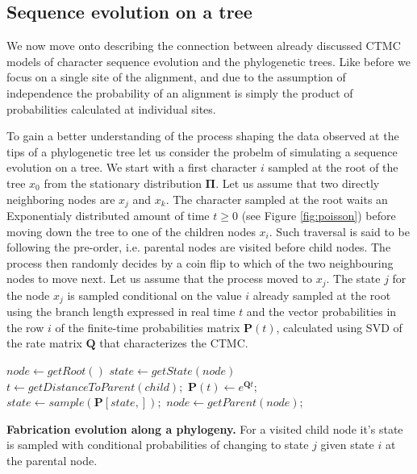 \documentclass[12pt,twoside]{mitthesis}
\theoremstyle{plain}
\theoremstyle{definition}
\theoremstyle{remark}
\begin{document}
\subsection{Sequence evolution on a tree\label{sub:evolutionOnTree}}

We now move onto describing the connection between already discussed CTMC models of character sequence evolution and the phylogenetic trees.
Like before we focus on a single site of the alignment, and due to the assumption of independence the probability of an alignment is simply the product of probabilities calculated at individual sites.

To gain a better understanding of the process shaping the data observed at the tips of a phylogenetic tree let us consider the probelm of simulating a sequence evolution on a tree.
We start with a first character $i$ sampled at the root of the tree $x_0$ from the stationary distribution $\mathbf{\Pi}$.
Let us assume that two directly neighboring nodes are $x_j$ and $x_k$.
The character sampled at the root waits an Exponentialy distributed amount of time $t\geq0$ (see Figure \ref{fig:poisson}) before moving down the tree to one of the children nodes $x_i$.
Such traversal is said to be following the pre-order, i.e. parental nodes are visited before child nodes.   
The process then randomly decides by a coin flip to which of the two neighbouring nodes to move next.
Let us assume that the process moved to $x_j$.
The state $j$ for the node $x_j$ is sampled conditional on the value $i$ already sampled at the root using the branch length expressed in real time $t$ and the vector probabilities in the row $i$ of the finite-time probabilities matrix $\mathbf{P}(t)$, calculated using SVD of the rate matrix $\mathbf{Q}$ that characterizes the CTMC.   

\begin{algorithm}
\begin{center}
\begin{algorithmic}[1]
\footnotesize{
%
\State $node \gets getRoot\left(\right)$
%
\State $state \gets getState\left(node\right)$
%
\Repeat
%
%
%
\State $t \gets getDistanceToParent\left(child\right);$
%
\State $ \mathbf{P}\left(t\right) \gets e^{\mathbf{Q}t};$
%
\State $state \gets sample\left(\mathbf{P}\left[ state, \right]\right);$
%
\EndFor
%
\Else {}
%
\State $node \gets getParent\left(node\right);$
%
\EndIf
%
}
\end{algorithmic}
\end{center}
\caption{{ \footnotesize {\bf Fabrication evolution along a phylogeny.} 
For a visited child node it's state is sampled with conditional probabilities of changing to state $j$ given state $i$ at the parental node.
}}
\end{algorithm}
\end{document}
